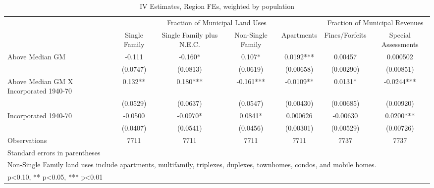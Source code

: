 \begin{table}[htbp]\centering
\def\sym#1{\ifmmode^{#1}\else\(^{#1}\)\fi}
\caption{IV Estimates, Region FEs, weighted by population}
\begin{tabular}{l*{6}{c}}
\toprule
                    &\multicolumn{4}{c}{Fraction of Municipal Land Uses}            &\multicolumn{2}{c}{Fraction of Municipal Revenues}\\\cmidrule(lr){2-5}\cmidrule(lr){6-7}
                    &\multicolumn{1}{c}{Single Family}&\multicolumn{1}{c}{Single Family plus N.E.C.}&\multicolumn{1}{c}{Non-Single Family}&\multicolumn{1}{c}{Apartments}&\multicolumn{1}{c}{Fines/Forfeits}&\multicolumn{1}{c}{Special Assessments}\\
\midrule
Above Median GM     &      -0.111   &      -0.160*  &       0.107*  &      0.0192***&     0.00457   &    0.000502   \\
                    &    (0.0747)   &    (0.0813)   &    (0.0619)   &   (0.00658)   &   (0.00290)   &   (0.00851)   \\
\addlinespace
Above Median GM X Incorporated 1940-70&       0.132** &       0.180***&      -0.161***&     -0.0109** &      0.0131*  &     -0.0244***\\
                    &    (0.0529)   &    (0.0637)   &    (0.0547)   &   (0.00430)   &   (0.00685)   &   (0.00920)   \\
\addlinespace
Incorporated 1940-70&     -0.0500   &     -0.0970*  &      0.0841*  &    0.000626   &    -0.00630   &      0.0200***\\
                    &    (0.0407)   &    (0.0541)   &    (0.0456)   &   (0.00301)   &   (0.00529)   &   (0.00726)   \\
\midrule
Observations        &        7711   &        7711   &        7711   &        7711   &        7737   &        7737   \\
\bottomrule
\multicolumn{7}{l}{\footnotesize Standard errors in parentheses}\\
\multicolumn{7}{l}{\footnotesize Non-Single Family land uses include apartments, multifamily, triplexes, duplexes, townhomes, condos, and mobile homes.}\\
\multicolumn{7}{l}{\footnotesize * p<0.10, ** p<0.05, *** p<0.01}\\
\end{tabular}
\end{table}
